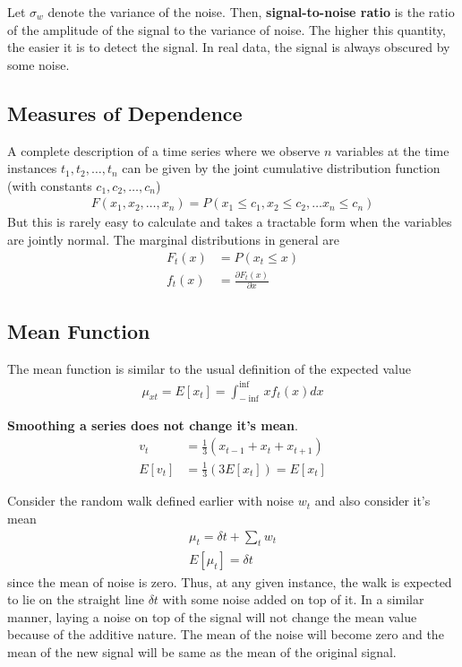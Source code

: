 \documentclass[../time_series_notes.tex]{subfiles}
\begin{document}
    Let $\sigma_{w}$ denote the variance of the noise. Then, \textbf{signal-to-noise ratio} is the ratio of the amplitude of the signal to the variance of noise. The higher this quantity, the easier it is to detect the signal. In real data, the signal is always obscured by some noise.


    \subsection{Measures of Dependence}
    A complete description of a time series where we observe $n$ variables at the time instances $t_{1}, t_{2}, \ldots, t_{n}$ can be given by the joint cumulative distribution function (with constants $c_{1}, c_{2}, \ldots, c_{n}$)
    \begin{align*}
        F(x_{1}, x_{2}, \ldots, x_{n}) = P(x_{1} \leq c_{1}, x_{2} \leq c_{2}, \ldots x_{n} \leq c_{n})
    \end{align*}
    But this is rarely easy to calculate and takes a tractable form when the variables are jointly normal. The marginal distributions in general are
    \begin{align*}
        F_{t}(x) &= P(x_{t} \leq x)\\
        f_{t}(x) &= \frac{\partial F_{t}(x)}{\partial x}
    \end{align*}

    
    \subsection{Mean Function} \label{mean_fun}
    The mean function is similar to the usual definition of the expected value
    \begin{align*}
        \mu_{xt} = E[x_{t}] =  \int_{-\inf}^{\inf} x f_{t}(x) dx
    \end{align*}

    \textbf{Smoothing a series does not change it's mean}.
    \begin{align*}
        v_{t} &= \frac{1}{3}(x_{t-1} + x_{t} + x_{t+1})\\
        E[v_{t}] &= \frac{1}{3}(3E[x_{t}]) = E[x_{t}]
    \end{align*}

    Consider the random walk defined earlier with noise $w_{t}$ and also consider it's mean
    \begin{align*}
        \mu_{t} = \delta t + \sum_{t} w_{t}\\
        E[\mu_{t}] = \delta t
    \end{align*}
    since the mean of noise is zero. Thus, at any given instance, the walk is expected to lie on the straight line $\delta t$ with some noise added on top of it.\newline
    In a similar manner, laying a noise on top of the signal will not change the mean value because of the additive nature. The mean of the noise will become zero and the mean of the new signal will be same as the mean of the original signal.
\end{document}
